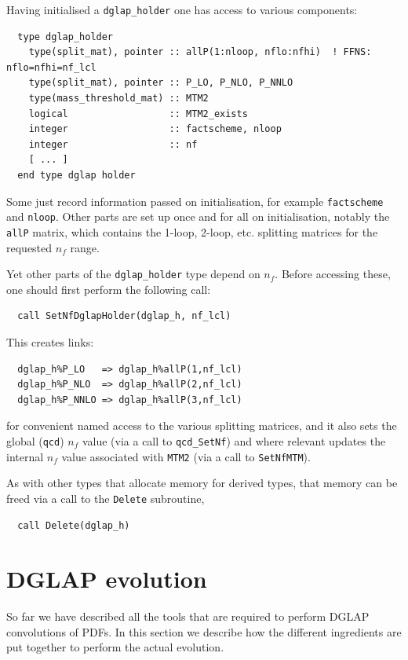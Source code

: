\documentclass[12pt]{article}
\newcommand{\ttt}[1]{\texttt{#1}}
\begin{document}
Having initialised a \ttt{dglap\_holder} one has access to various components:
\begin{lstlisting}
  type dglap_holder
    type(split_mat), pointer :: allP(1:nloop, nflo:nfhi)  ! FFNS: nflo=nfhi=nf_lcl
    type(split_mat), pointer :: P_LO, P_NLO, P_NNLO
    type(mass_threshold_mat) :: MTM2
    logical                  :: MTM2_exists
    integer                  :: factscheme, nloop
    integer                  :: nf
    [ ... ]
  end type dglap holder
\end{lstlisting}
Some just record information passed on initialisation, for example
\ttt{factscheme} and \ttt{nloop}. Other parts are set up once and for
all on initialisation, notably the \ttt{allP} matrix, which contains
the 1-loop, 2-loop, etc. splitting matrices for the requested $n_f$
range.

Yet other parts of the \ttt{dglap\_holder} type depend on $n_f$.
Before accessing these, one should first perform the following call:
\begin{lstlisting}
  call SetNfDglapHolder(dglap_h, nf_lcl)
\end{lstlisting}
This creates links:
\begin{lstlisting}
  dglap_h%P_LO   => dglap_h%allP(1,nf_lcl)
  dglap_h%P_NLO  => dglap_h%allP(2,nf_lcl)
  dglap_h%P_NNLO => dglap_h%allP(3,nf_lcl)
\end{lstlisting}
for convenient named access to the various splitting matrices, and it
also sets the global (\ttt{qcd}) $n_f$ value (via a call to
\ttt{qcd\_SetNf}) and where relevant updates the internal $n_f$ value
associated with \ttt{MTM2} (via a call to \ttt{SetNfMTM}).

As with other types that allocate memory for derived types, that
memory can be freed via a call to the \ttt{Delete} subroutine,
\begin{lstlisting}
  call Delete(dglap_h)
\end{lstlisting}

\section{DGLAP evolution}
So far we have described all the tools that are required
to perform  DGLAP convolutions of PDFs. In this section
we describe how the different ingredients are put together
to perform the actual evolution.
\end{document}
